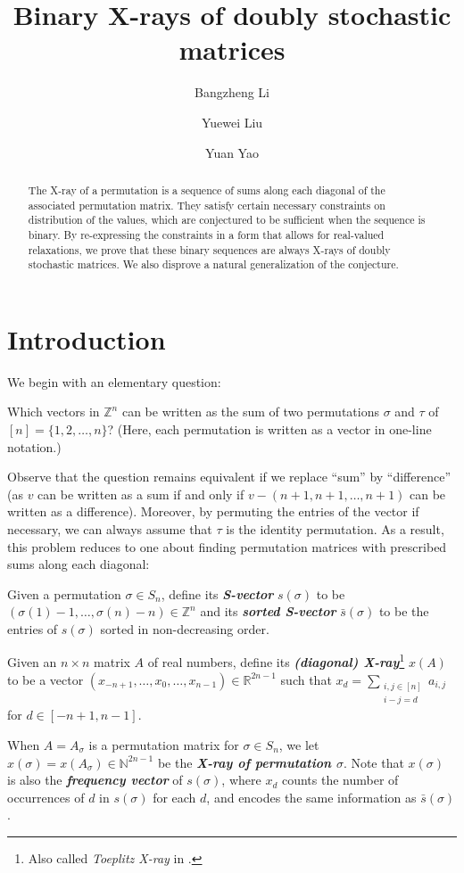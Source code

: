 \documentclass[letterpaper,reqno,11pt]{amsart}
\title{Binary X-rays of doubly stochastic matrices}
\author{Bangzheng Li \and Yuewei Liu \and Yuan Yao}
\newcommand{\bfemph}[1]{\textbf{\emph{#1}}}
\begin{document}
\begin{abstract}
    The X-ray of a permutation is a sequence of sums along each diagonal of the associated permutation matrix. They satisfy certain necessary constraints on distribution of the values, which are conjectured to be sufficient when the sequence is binary. By re-expressing the constraints in a form that allows for real-valued relaxations, we prove that these binary sequences are always X-rays of doubly stochastic matrices. We also disprove a natural generalization of the conjecture.
\end{abstract}

\maketitle

\section{Introduction}

We begin with an elementary question:

\begin{question}\label{question}
    Which vectors in $\mathbb{Z}^n$ can be written as the sum of two permutations $\sigma$ and $\tau$ of $[n] = \{1, 2, \dots, n\}$? (Here, each permutation is written as a vector in one-line notation.)
\end{question}

Observe that the question remains equivalent if we replace ``sum'' by ``difference'' (as $v$ can be written as a sum if and only if $v - (n+1, n+1, \dots, n+1)$ can be written as a difference). Moreover, by permuting the entries of the vector if necessary, we can always assume that $\tau$ is the identity permutation. As a result, this problem reduces to one about finding permutation matrices with prescribed sums along each diagonal:

\begin{definition}
    Given a permutation $\sigma\in S_n$, define its \bfemph{S-vector} $s(\sigma)$ to be $(\sigma(1)-1, \dots, \sigma(n)-n)\in \mathbb{Z}^{n}$ and its \bfemph{sorted S-vector} $\bar{s}(\sigma)$ to be the entries of $s(\sigma)$ sorted in non-decreasing order.
    
    Given an $n\times n$ matrix $A$ of real numbers, define its \bfemph{(diagonal) X-ray}\footnote{Also called \emph{Toeplitz X-ray} in \cite{BF2014}.} $x(A)$ to be a vector $(x_{-n+1}, \dots, x_0, \dots, x_{n-1})\in \mathbb{R}^{2n-1}$ such that $x_d = \sum_{\substack{i, j\in [n]\\ i-j=d}} a_{i,j}$ for $d \in [-n+1, n-1]$. 
    
    When $A = A_\sigma$ is a permutation matrix for $\sigma\in S_n$, we let $x(\sigma) = x(A_\sigma)\in \mathbb{N}^{2n-1}$ be the \bfemph{X-ray of permutation $\sigma$}. Note that $x(\sigma)$ is also the \bfemph{frequency vector} of $s(\sigma)$, where $x_d$ counts the number of occurrences of $d$ in $s(\sigma)$ for each $d$, and encodes the same information as $\bar{s}(\sigma)$.
\end{definition}
\end{document}

